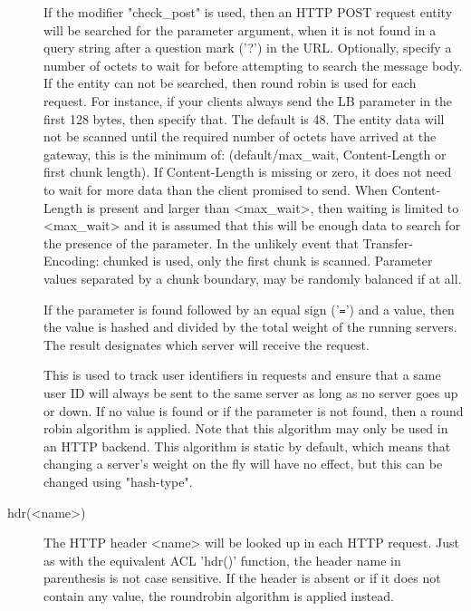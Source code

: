 \begin{description}
                  If the modifier "check\_post" is used, then an HTTP POST
                  request entity will be searched for the parameter argument,
                  when it is not found in a query string after a question mark
                  ('?') in the URL. Optionally, specify a number of octets to
                  wait for before attempting to search the message body. If the
                  entity can not be searched, then round robin is used for each
                  request. For instance, if your clients always send the LB
                  parameter in the first 128 bytes, then specify that. The
                  default is 48. The entity data will not be scanned until the
                  required number of octets have arrived at the gateway, this
                  is the minimum of: (default/max\_wait, Content-Length or first
                  chunk length). If Content-Length is missing or zero, it does
                  not need to wait for more data than the client promised to
                  send. When Content-Length is present and larger than
                  <max\_wait>, then waiting is limited to <max\_wait> and it is
                  assumed that this will be enough data to search for the
                  presence of the parameter. In the unlikely event that
                  Transfer-Encoding: chunked is used, only the first chunk is
                  scanned. Parameter values separated by a chunk boundary, may
                  be randomly balanced if at all.

                  If the parameter is found followed by an equal sign ('\verb|=|') and
                  a value, then the value is hashed and divided by the total
                  weight of the running servers. The result designates which
                  server will receive the request.

                  This is used to track user identifiers in requests and ensure
                  that a same user ID will always be sent to the same server as
                  long as no server goes up or down. If no value is found or if
                  the parameter is not found, then a round robin algorithm is
                  applied. Note that this algorithm may only be used in an HTTP
                  backend. This algorithm is static by default, which means
                  that changing a server's weight on the fly will have no
                  effect, but this can be changed using "hash-type".

      \item[hdr(<name>)] The HTTP header <name> will be looked up in each HTTP
                  request. Just as with the equivalent ACL 'hdr()' function,
                  the header name in parenthesis is not case sensitive. If the
                  header is absent or if it does not contain any value, the
                  roundrobin algorithm is applied instead.


\end{description}
